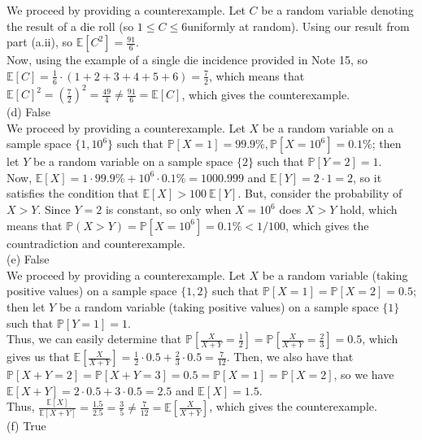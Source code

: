 \documentclass{article}
\begin{document}
We proceed by providing a counterexample. Let $C$ be a random variable denoting the result of a die roll (so $1\leq C\leq6$uniformly at random). Using our result from part (a.ii), so $\mathbb{E}[C^2] = \frac{91}{6}$. \\

Now, using the example of a single die incidence provided in Note 15, so $\mathbb{E}[C] = \frac{1}{6}\cdot(1+2+3+4+5+6) = \frac{7}{2}$, which means that $\mathbb{E}[C]^2 = (\frac{7}{2})^2 = \frac{49}{4} \neq \frac{91}{6} = \mathbb{E}[C]$, which gives the counterexample. \\[.5cm]
{\color{red} (d) False} \\

We proceed by providing a counterexample. Let $X$ be a random variable on a sample space $\{1, 10^6\}$ such that $\mathbb{P}[X=1] = 99.9\%, \mathbb{P}[X=10^6] = 0.1\%$; then let $Y$ be a random variable on a sample space $\{2\}$ such that $\mathbb{P}[Y=2] = 1$. \\

Now, $\mathbb{E}[X] = 1\cdot99.9\% + 10^6\cdot0.1\% = 1000.999$ and $\mathbb{E}[Y] = 2\cdot1 = 2$, so it satisfies the condition that $\mathbb{E}[X] > 100\ \mathbb{E}[Y]$. But, consider the probability of $X>Y$. Since $Y = 2$ is constant, so only when $X = 10^6$ does $X>Y$ hold, which means that $\mathbb{P}(X>Y) = \mathbb{P}[X=10^6] = 0.1\% < 1/100$, which gives the countradiction and counterexample. \\[.5cm]
{\color{red} (e) False} \\

We proceed by providing a counterexample. Let $X$ be a random variable (taking positive values) on a sample space $\{1, 2\}$ such that $\mathbb{P}[X=1] = \mathbb{P}[X=2] = 0.5$; then let $Y$ be a random variable (taking positive values) on a sample space $\{1\}$ such that $\mathbb{P}[Y=1] = 1$. \\

Thus, we can easily determine that
$\mathbb{P}[\frac{X}{X+Y}=\frac{1}{2}] =
\mathbb{P}[\frac{X}{X+Y}=\frac{2}{3}] = 0.5$, which gives us that
$\mathbb{E}[\frac{X}{X+Y}] = \frac{1}{2}\cdot0.5 + \frac{2}{3}\cdot0.5 = \frac{7}{12}$. Then, we also have that
$\mathbb{P}[X+Y=2] = \mathbb{P}[X+Y=3] = 0.5 =
\mathbb{P}[X=1] = \mathbb{P}[X=2]$, so we have
$\mathbb{E}[X+Y] = 2\cdot0.5 + 3\cdot0.5 = 2.5$ and $\mathbb{E}[X] = 1.5$. \\

Thus, $\frac{\mathbb{E}[X]}{\mathbb{E}[X+Y]} = \frac{1.5}{2.5} = \frac{3}{5}\neq\frac{7}{12} = \mathbb{E}[\frac{X}{X+Y}]$, which gives the counterexample. \\[.5cm]
{\color{red} (f) True} \\
\end{document}
